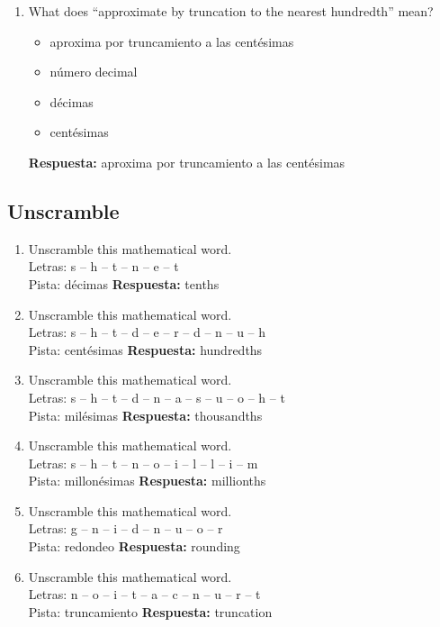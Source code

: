 \documentclass[11pt,a4paper]{article}
\begin{document}
\begin{enumerate}
\begin{itemize}
\item décimas
\item centésimas
\end{itemize}
\textbf{Respuesta:} truncamiento
\item What does ``approximate by truncation to the nearest hundredth'' mean?
\begin{itemize}
\item aproxima por truncamiento a las centésimas
\item número decimal
\item décimas
\item centésimas
\end{itemize}
\textbf{Respuesta:} aproxima por truncamiento a las centésimas
\end{enumerate}
\subsection{Unscramble}
\begin{enumerate}
\item Unscramble this mathematical word.\\Letras: s -- h -- t -- n -- e -- t\\Pista: décimas
\textbf{Respuesta:} tenths
\item Unscramble this mathematical word.\\Letras: s -- h -- t -- d -- e -- r -- d -- n -- u -- h\\Pista: centésimas
\textbf{Respuesta:} hundredths
\item Unscramble this mathematical word.\\Letras: s -- h -- t -- d -- n -- a -- s -- u -- o -- h -- t\\Pista: milésimas
\textbf{Respuesta:} thousandths
\item Unscramble this mathematical word.\\Letras: s -- h -- t -- n -- o -- i -- l -- l -- i -- m\\Pista: millonésimas
\textbf{Respuesta:} millionths
\item Unscramble this mathematical word.\\Letras: g -- n -- i -- d -- n -- u -- o -- r\\Pista: redondeo
\textbf{Respuesta:} rounding
\item Unscramble this mathematical word.\\Letras: n -- o -- i -- t -- a -- c -- n -- u -- r -- t\\Pista: truncamiento
\textbf{Respuesta:} truncation
\end{enumerate}
\end{document}
